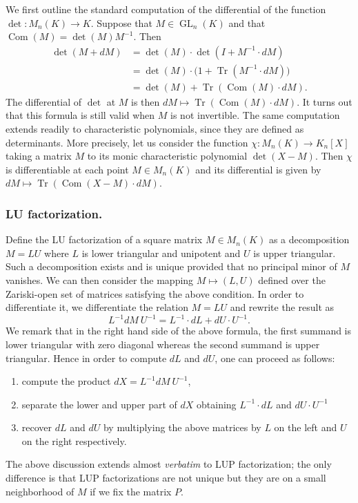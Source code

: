 \documentclass{lms}
\DeclareMathOperator{\GL}{GL}
\DeclareMathOperator{\tr}{Tr}
\DeclareMathOperator{\com}{Com}
\begin{document}
We first outline the standard computation of the differential of the function
$\det : M_n(K) \to K$. Suppose that $M \in \GL_n(K)$ and that $\com(M) = \det(M) M^{-1}$.
Then
\begin{align*}
\det(M + dM) &= \det(M) \cdot \det(I + M^{-1} \cdot dM)  \\
&= \det(M) \cdot \big(1 + \tr(M^{-1} \cdot dM)\big) \\
&= \det(M) + \tr(\com(M) \cdot dM).
\end{align*}
The differential of $\det$ at $M$ is then $dM \mapsto \tr(\com(M) \cdot dM)$. It turns
out that this formula is still valid when $M$ is not invertible.
The same computation extends readily to characteristic polynomials,
since they are defined as determinants. More precisely, let us 
consider the function $\chi : M_n(K) \to K_n[X]$ taking a matrix 
$M$ to its monic characteristic polynomial $\det(X-M)$.
Then $\chi$ is differentiable at each point $M \in M_n(K)$ and its 
differential is given by $dM \mapsto \tr(\com(X{-}M) \cdot dM)$.

\subsubsection*{LU factorization.}

Define the LU factorization of a square matrix $M \in M_n(K)$ as a decomposition $M = LU$ 
where $L$ is lower triangular and unipotent and $U$ is upper triangular. 
Such a decomposition exists and is unique provided that no principal minor
of $M$ vanishes. We can then consider the mapping $M \mapsto (L,U)$ 
defined over the Zariski-open set of matrices satisfying the above 
condition. In order to differentiate it, we differentiate the relation 
$M = LU$ and rewrite the result as
$$L^{-1} dM \: U^{-1} = L^{-1} \cdot dL + dU \cdot U^{-1}.$$
We remark that in the right hand side of the above formula, the first
summand is lower triangular with zero diagonal whereas 
the second summand is upper triangular. Hence in order to compute $dL$
and $dU$, one can proceed as follows: 
\begin{enumerate}
\item compute the product $dX = L^{-1} dM \: U^{-1}$,
\item separate the lower and upper part of $dX$ obtaining $L^{-1} \cdot dL$ and $dU \cdot U^{-1}$
\item recover $dL$ and $dU$ by multiplying the above matrices by $L$ on the left and $U$ on the right respectively.
\end{enumerate}
The above discussion extends almost \emph{verbatim} to LUP 
factorization; the only difference is that LUP factorizations are not 
unique but they are on a small neighborhood of $M$ if we fix the matrix 
$P$.
\end{document}
